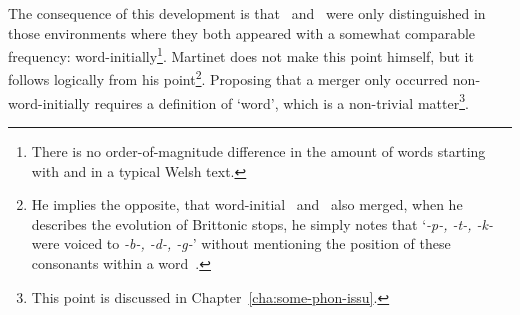 The consequence of this development is that \lT\ and \xD\ were only distinguished in those environments where they both appeared with a somewhat comparable frequency: word-initially\footnote{There is no order-of-magnitude difference in the amount of words starting with \eg {} and  in a typical Welsh text.}. Martinet does not make this point himself, but it follows logically from his point\footnote{He implies the opposite, \ie that word-initial \xD\ and \lT\ also merged, when he describes the evolution of Brittonic stops, he simply notes that `\textit{-p-, -t-, -k-} were voiced to \textit{-b-, -d-, -g-}' without mentioning the position of these consonants within a word~\autocite[198]{martinet_celtic_1952}.}.
Proposing that a merger only occurred non-word-initially requires a definition of `word', which is a non-trivial matter\footnote{This point is discussed in Chapter~\ref{cha:some-phon-issu}.}. 


